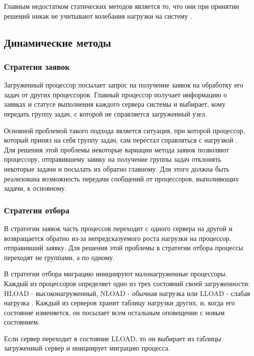 Главным недостатком статических методов является то, что они при принятии решений никак не учитывают колебания нагрузки на систему \cite{cyberlenin2}.

\subsection{Динамические методы}

\subsubsection{Стратегия заявок}

Загруженный процессор посылает запрос на получение заявок на обработку его задач от других процессоров. Главный процессор получает информацию о заявках и статусе выполнения каждого сервера системы и выбирает, кому передать группу задач, с которой не справляется загруженный узел. 

Основной проблемой такого подхода является ситуация, при которой процессор, который принял на себя группу задач, сам перестал справляться с нагрузкой \cite{cyberlenin2}. Для решения этой проблемы некоторые вариации метода заявок позволяют процессору, отправившему заявку на получение группы задач отклонять некоторые задачи и посылать их обратно главному. Для этого должна быть реализована возможность передачи сообщений от процессоров, выполняющих задачи, к основному.

\subsubsection{Стратегия отбора}

В стратегии заявок часть процессов переходит с одного сервера на другой и возвращается обратно из-за непредсказуемого роста нагрузки на процессор, отправивший заявку. Для решения этой проблемы в стратегии отбора процессы переходят не группами, а по одному.

В стратегии отбора миграцию инициируют малонагруженные процессоры. Каждый из процессоров определяет одно из трех состояний своей загруженности: HLOAD - высоконагруженный, NLOAD - обычная нагрузка или LLOAD - слабая нагрузка \cite{cyberlenin2}. Каждый из серверов хранит таблицу нагрузки других, и, когда его состояние изменяется, он посылает всем остальным оповещение с новым состоянием.

Если сервер переходит в состояние LLOAD, то он выбирает из таблицы загруженный сервер и инициирует миграцию процесса.

